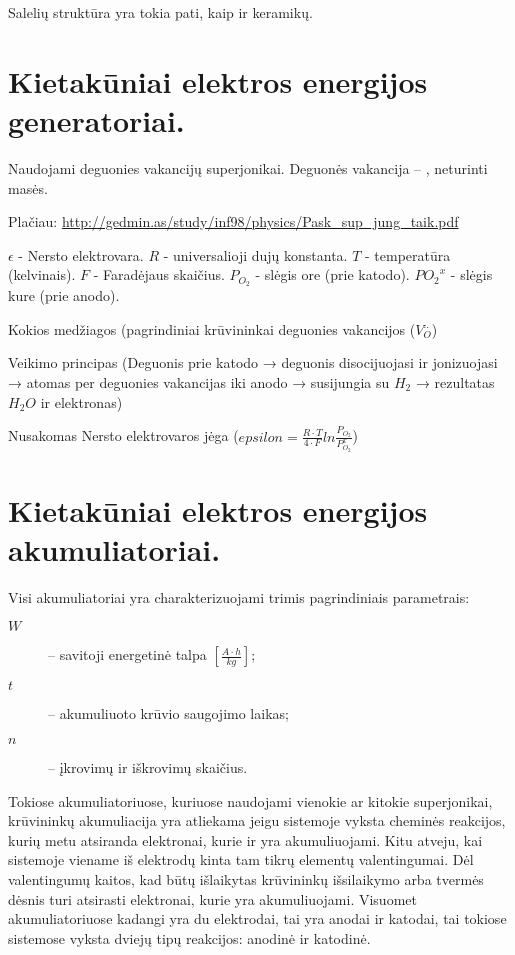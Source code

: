 Salelių struktūra yra tokia pati, kaip ir keramikų.

\section{Kietakūniai elektros energijos generatoriai.}
Naudojami deguonies vakancijų superjonikai. Deguonės vakancija – ,
neturinti masės.

Plačiau: \url{http://gedmin.as/study/inf98/physics/Pask_sup_jung_taik.pdf}

$\epsilon$ - Nersto elektrovara.
$R$ - universalioji dujų konstanta.
$T$ - temperatūra (kelvinais).
$F$ - Faradėjaus skaičius.
$P_{O_2}$ - slėgis ore (prie katodo).
$P{O_2}^x$ - slėgis kure (prie anodo).

\begin{remember}
  \item Kokios medžiagos (pagrindiniai krūvininkai deguonies vakancijos
  ($V_{O}^{..}$) 
  \item Veikimo principas (Deguonis prie katodo → deguonis
  disocijuojasi ir jonizuojasi →  atomas per deguonies vakancijas
  iki anodo → susijungia su $H_2$ → rezultatas $H_2 O$ ir elektronas)
  \item Nusakomas Nersto elektrovaros jėga
  ($epsilon = \frac{R \cdot T}{4 \cdot F}ln \frac{P_{O_2}}{P_{O_2}^x}$)
\end{remember}

\section{Kietakūniai elektros energijos akumuliatoriai.}

Visi akumuliatoriai yra charakterizuojami trimis pagrindiniais parametrais:
\begin{description}
  \item[$W$]  – savitoji energetinė talpa
    $\left[ \frac{A \cdot h}{kg} \right]$;
  \item[$t$] – akumuliuoto krūvio saugojimo laikas;
  \item[$n$] – įkrovimų ir iškrovimų skaičius.
\end{description}

Tokiose akumuliatoriuose, kuriuose naudojami vienokie ar kitokie
superjonikai, krūvininkų akumuliacija yra atliekama jeigu sistemoje
vyksta cheminės reakcijos, kurių metu atsiranda elektronai, kurie
ir yra akumuliuojami. Kitu atveju, kai sistemoje viename iš
elektrodų kinta tam tikrų elementų valentingumai. Dėl valentingumų
kaitos, kad būtų išlaikytas krūvininkų išsilaikymo arba tvermės
dėsnis turi atsirasti elektronai, kurie yra akumuliuojami.
Visuomet akumuliatoriuose kadangi yra du elektrodai, tai yra anodai
ir katodai, tai tokiose sistemose vyksta dviejų tipų reakcijos:
anodinė ir katodinė.

